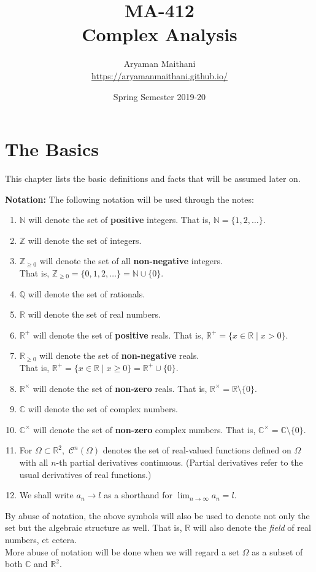 \documentclass[12pt,oneside]{book}
\title{MA-412\\ Complex Analysis}
\author{Aryaman Maithani\\\url{https://aryamanmaithani.github.io/}}
\date{Spring Semester 2019-20}
\theoremstyle{definition}
\numberwithin{thm}{chapter}
\begin{document}
\maketitle
\tableofcontents

\chapter{The Basics}
This chapter lists the basic definitions and facts that will be assumed later on.

\textbf{Notation:} The following notation will be used through the notes:
\begin{enumerate}
	\item $\mathbb{N}$ will denote the set of \textbf{positive} integers. That is, $\mathbb{N} = \{1, 2, \ldots\}.$
	\item $\mathbb{Z}$ will denote the set of integers.
	\item $\mathbb{Z}_{\ge 0}$ will denote the set of all \textbf{non-negative} integers. \\
	That is, $\mathbb{Z}_{\ge 0} = \{0, 1, 2, \ldots\} = \mathbb{N} \cup \{0\}.$
	\item $\mathbb{Q}$ will denote the set of rationals.
	\item $\mathbb{R}$ will denote the set of real numbers.
	\item $\mathbb{R}^+$ will denote the set of \textbf{positive} reals. That is, $\mathbb{R}^+ = \{x \in \mathbb{R} \mid x > 0\}.$
	\item $\mathbb{R}_{\ge0}$ will denote the set of \textbf{non-negative} reals. \\
	That is, $\mathbb{R}^+ = \{x \in \mathbb{R} \mid x \ge 0\} = \mathbb{R}^+\cup \{0\}.$
	\item $\mathbb{R}^\times$ will denote the set of \textbf{non-zero} reals. That is, $\mathbb{R}^\times = \mathbb{R}\setminus\{0\}.$
	\item $\mathbb{C}$ will denote the set of complex numbers.
	\item $\mathbb{C}^\times$ will denote the set of \textbf{non-zero} complex numbers. That is, $\mathbb{C}^\times = \mathbb{C}\setminus\{0\}.$
	\item For $\Omega \subset \mathbb{R}^2,$ $\mathcal{C}^n(\Omega)$ denotes the set of real-valued functions defined on $\Omega$ with all $n$-th partial derivatives continuous. (Partial derivatives refer to the usual derivatives of real functions.)
	\item We shall write $a_n \to l$ as a shorthand for $\displaystyle\lim_{n\to \infty}a_n = l.$
\end{enumerate}
By abuse of notation, the above symbols will also be used to denote not only the set but the algebraic structure as well. That is, $\mathbb{R}$ will also denote the \emph{field} of real numbers, et cetera.\\
More abuse of notation will be done when we will regard a set $\Omega$ as a subset of both $\mathbb{C}$ and $\mathbb{R}^2.$
\end{document}
